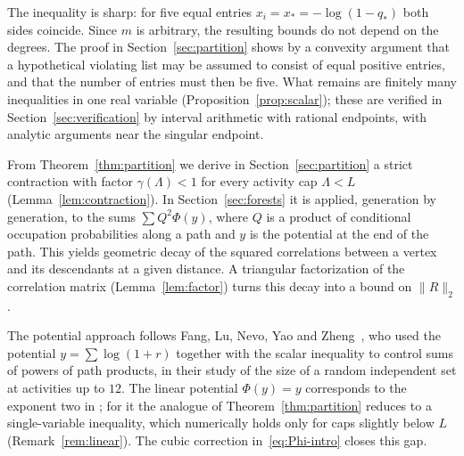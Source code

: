 \documentclass{amsart}
\numberwithin{equation}{section}
\numberwithin{table}{section}
\theoremstyle{definition}
\theoremstyle{remark}
\newcommand{\qs}{q_{\ast}}
\newcommand{\xs}{x_{\ast}}
\begin{document}
The inequality is sharp: for five equal entries $x_i=\xs=-\log(1-\qs)$ both sides coincide. Since $m$ is arbitrary, the resulting bounds do not depend on the degrees. The proof in Section~\ref{sec:partition} shows by a convexity argument that a hypothetical violating list may be assumed to consist of equal positive entries, and that the number of entries must then be five. What remains are finitely many inequalities in one real variable (Proposition~\ref{prop:scalar}); these are verified in Section~\ref{sec:verification} by interval arithmetic with rational endpoints, with analytic arguments near the singular endpoint.

From Theorem~\ref{thm:partition} we derive in Section~\ref{sec:partition} a strict contraction with factor $\gamma(\Lambda)<1$ for every activity cap $\Lambda<L$ (Lemma~\ref{lem:contraction}). In Section~\ref{sec:forests} it is applied, generation by generation, to the sums $\sum Q^2\Phi(y)$, where $Q$ is a product of conditional occupation probabilities along a path and $y$ is the potential at the end of the path. This yields geometric decay of the squared correlations between a vertex and its descendants at a given distance. A triangular factorization of the correlation matrix (Lemma~\ref{lem:factor}) turns this decay into a bound on $\|R\|_2$.

The potential approach follows Fang, Lu, Nevo, Yao and Zheng~\cite{FLNYZ}, who used the potential $y=\sum\log(1+r)$ together with the scalar inequality \cite[Lemma~4.2]{FLNYZ} to control sums of powers of path products, in their study of the size of a random independent set at activities up to $12$. The linear potential $\Phi(y)=y$ corresponds to the exponent two in \cite[(4.5)]{FLNYZ}; for it the analogue of Theorem~\ref{thm:partition} reduces to a single-variable inequality, which numerically holds only for caps slightly below $L$ (Remark~\ref{rem:linear}). The cubic correction in~\eqref{eq:Phi-intro} closes this gap.
\end{document}
